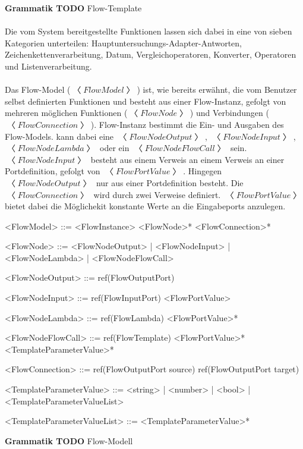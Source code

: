 \documentclass{article}
\begin{document}
    \textbf{Grammatik TODO} Flow-Template\\\\
    Die vom System bereitgestellte Funktionen lassen sich dabei in eine von sieben Kategorien unterteilen: Hauptuntersuchungs-Adapter-Antworten, Zeichenkettenverarbeitung, Datum, Vergleichoperatoren, Konverter, Operatoren und Listenverarbeitung.\\\\
    Das Flow-Model ($〈FlowModel〉$) ist, wie bereits erwähnt, die vom Benutzer selbst definierten Funktionen und besteht aus einer Flow-Instanz, gefolgt von mehreren möglichen Funktionen ($〈FlowNode〉$) und Verbindungen ($〈FlowConnection〉$).
    Flow-Instanz bestimmt die Ein- und Ausgaben des Flow-Models.
    kann dabei eine $〈FlowNodeOutput〉$, $〈FlowNodeInput〉$, $〈FlowNodeLambda〉$ oder ein $〈FlowNodeFlowCall〉$ sein.
    $〈FlowNodeInput〉$ besteht aus einem Verweis an einem Verweis an einer Portdefinition, gefolgt von $〈FlowPortValue〉$. Hingegen $〈FlowNodeOutput〉$ nur aus einer Portdefinition besteht.
    Die $〈FlowConnection〉$ wird durch zwei Verweise definiert.
    $〈FlowPortValue〉$ bietet dabei die Möglichekit konstante Werte an die Eingabeports anzulegen.
    \begin{grammar}
        <FlowModel> ::= <FlowInstance> <FlowNode>* <FlowConnection>*

        <FlowNode> ::= <FlowNodeOutput> | <FlowNodeInput> | <FlowNodeLambda> | <FlowNodeFlowCall>
       
        <FlowNodeOutput> ::= ref(FlowOutputPort)

        <FlowNodeInput> ::= ref(FlowInputPort) <FlowPortValue>

        <FlowNodeLambda> ::= ref(FlowLambda) <FlowPortValue>*

        <FlowNodeFlowCall> ::= ref(FlowTemplate) <FlowPortValue>* <TemplateParameterValue>*
    
        <FlowConnection> ::= ref(FlowOutputPort source) ref(FlowOutputPort target)
    
        <TemplateParameterValue> ::= <string> | <number> | <bool> | <TemplateParameterValueList>
    
        <TemplateParameterValueList> ::= <TemplateParameterValue>*
    \end{grammar}
    \textbf{Grammatik TODO} Flow-Modell
\end{document}
